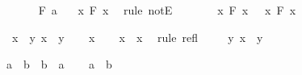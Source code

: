 \begin{isabellebody}
\ \ \ \ \isamarkupfalse%
\ {\isacharbackquoteopen}{\isasymnot}\ F\ a{\isacharbackquoteclose}\ \isamarkupfalse%
\ {\isachardoublequoteopen}{\isasymforall}\ x{\isachardot}\ F\ x{\isachardoublequoteclose}\ \isamarkupfalse%
\ {\isacharparenleft}rule\ notE{\isacharparenright}\isanewline
\ \ \isamarkupfalse%
\isanewline
\ \ \isamarkupfalse%
\ {\isachardoublequoteopen}{\isasymexists}\ x{\isachardot}\ F\ x\ {\isasymlongrightarrow}\ {\isacharparenleft}{\isasymforall}\ x{\isachardot}\ F\ x{\isacharparenright}{\isachardoublequoteclose}\isacommand{{\isachardot}{\isachardot}}\isamarkupfalse%
\isanewline
{}\isamarkupfalse%
%
\endisatagproof
{\isafoldproof}%
%
\isadelimproof
%
\endisadelimproof
%
\begin{isamarkuptext}%
\begin{Answer}[ref = everythingissomething] \end{Answer}%
\end{isamarkuptext}\isamarkuptrue%
\isamarkupfalse%
\ {\isachardoublequoteopen}{\isasymforall}\ x{\isachardot}\ {\isasymexists}\ y{\isachardot}\ x\ {\isacharequal}\ y{\isachardoublequoteclose}\isanewline
%
\isadelimproof
%
\endisadelimproof
%
\isatagproof
{}\isamarkupfalse%
\isanewline
\ \ \isamarkupfalse%
\ x\isanewline
\ \ \isamarkupfalse%
\ {\isachardoublequoteopen}x\ {\isacharequal}\ x{\isachardoublequoteclose}\ \isamarkupfalse%
\ {\isacharparenleft}rule\ refl{\isacharparenright}\isanewline
\ \ \isamarkupfalse%
\ {\isachardoublequoteopen}{\isasymexists}\ y{\isachardot}\ x\ {\isacharequal}\ y{\isachardoublequoteclose}\isacommand{{\isachardot}{\isachardot}}\isamarkupfalse%
\isanewline
{}\isamarkupfalse%
%
\endisatagproof
{\isafoldproof}%
%
\isadelimproof
%
\endisadelimproof
%
\begin{isamarkuptext}%
\begin{Answer}[ref = symmetry] \end{Answer}%
\end{isamarkuptext}\isamarkuptrue%
\isamarkupfalse%
\ {\isachardoublequoteopen}a\ {\isacharequal}\ b\ {\isasymlongrightarrow}\ b\ {\isacharequal}\ a{\isachardoublequoteclose}\isanewline
%
\isadelimproof
%
\endisadelimproof
%
\isatagproof
{}\isamarkupfalse%
\isanewline
\ \ \isamarkupfalse%
\ {\isachardoublequoteopen}a\ {\isacharequal}\ b{\isachardoublequoteclose}\isanewline
\ \ \isamarkupfalse%

\end{isabellebody}
